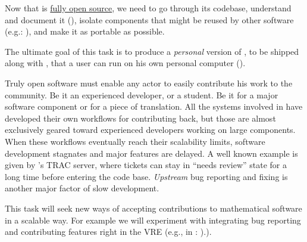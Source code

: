\begin{workpackage}[id=component-architecture,wphases=0-48!.5,
  title=Component Architecture,lead=UV,
  PSRM=50,UVRM=8,SARM=16, USORM=6, UORM=4, LLRM=14, UJFRM=6, UGRM=14]
\begin{tasklist}
\begin{task}[title=Document and modularise \SMC's codebase,id=extract-smc,lead=PS,PM=10,partners={UV,UG},wphases=0-24]
    Now that \SMC is
    \href{https://twitter.com/sagemath/status/544939872294014977}{fully
      open source}, we need to go through its codebase, understand and
    document it
    (), isolate
    components that might be reused by other software (e.g.:
    \Jupyter), and make it as portable as possible.

    The ultimate goal of this task is to produce a \emph{personal}
    version of \SMC, to be shipped along with \Sage, that a user can
    run on his own personal computer
    ().
  \end{task}

  \begin{task}[title=Improving the development workflow in mathematical software,id=workflow,lead=UV,PM=10,partners={PS,LL,UG},wphases=6-24]
    Truly open software must enable any actor to easily contribute his
    work to the community. Be it an experienced developer, or a
    student. Be it for a major software component or for a piece of
    translation. All the systems involved in \TheProject have
    developed their own workflows for contributing back, but those are
    almost exclusively geared toward experienced developers working on
    large components. When these workflows eventually reach their
    scalability limits, software development stagnates and major
    features are delayed. A well known example is given by \Sage's TRAC
    server, where tickets can stay in ``needs review'' state for a
    long time before entering the code base.  \emph{Upstream} bug
    reporting and fixing is another major factor of slow development.

    This task will seek new ways of accepting contributions to
    mathematical software in a scalable way. For example we will
    experiment with integrating bug reporting and contributing
    features right in the VRE (e.g., in \SMC:
    ).).

  \end{task}



\end{tasklist}
\end{workpackage}
